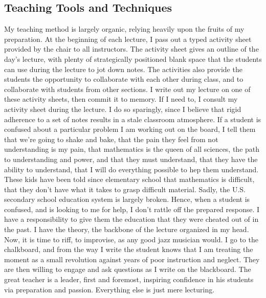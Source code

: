 \documentclass[12pt,oneside]{amsart}
\begin{document}
\subsection{Teaching Tools and Techniques} My teaching method is largely
organic, relying heavily upon the fruits of my preparation. At the beginning of
each lecture, I pass out a typed activity sheet provided by the chair to all
instructors. The activity sheet gives an outline of the day's lecture, with
plenty of strategically positioned blank space that the students can use during
the lecture to jot down notes. The activities also provide the students the
opportunity to collaborate with each other during class, and to collaborate with
students from other sections.  I write out my lecture on one of these activity
sheets, then commit it to memory. If I need to, I consult my activity sheet
during the lecture. I do so sparingly, since I believe that rigid adherence to a
set of notes results in a stale classroom atmosphere.  If a student is confused
about a particular problem I am working out on the board, I tell them that we're
going to shake and bake, that the pain they feel from not understanding is my
pain, that mathematics is the queen of all sciences, the path to understanding
and power, and that they must understand, that they have the ability to
understand, that I will do everything possible to hep them understand. These
kids have been told since elementary school that mathematics is difficult, that
they don't have what it takes to grasp difficult material. Sadly, the U.S.
secondary school education system is largely broken.  Hence, when a student is
confused, and is looking to me for help, I don't rattle off the prepared
response. I have a responsibility to give them the education that they were
cheated out of in the past. I have the theory, the backbone of the lecture
organized in my head. Now, it is time to riff, to improvise, as any good jazz
musician would. I go to the chalkboard, and from the way I write the student
knows that I am treating the moment as a small revolution against years of poor
instruction and neglect. They are then willing to engage and ask questions as I
write on the blackboard. The great teacher is a leader, first and foremost,
inspiring confidence in his students via preparation and passion. Everything
else is just mere lecturing.
\end{document}
